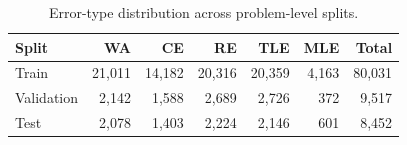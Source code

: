 \begin{table}[t]
\centering
\caption{Error-type distribution across problem-level splits.}
\label{tab:split-error-matrix}
\begin{tabular}{lrrrrrr}
\toprule
Split & WA & CE & RE & TLE & MLE & Total \\
\midrule
Train & 21,011 & 14,182 & 20,316 & 20,359 & 4,163 & 80,031 \\
Validation & 2,142 & 1,588 & 2,689 & 2,726 & 372 & 9,517 \\
Test & 2,078 & 1,403 & 2,224 & 2,146 & 601 & 8,452 \\
\bottomrule
\end{tabular}
\end{table}

